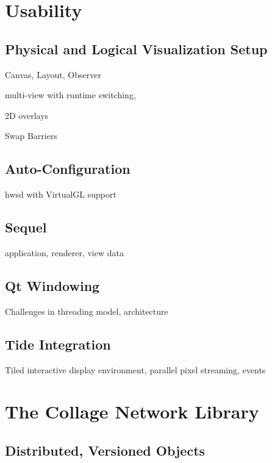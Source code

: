 \documentclass[journal]{vgtc}                %
\begin{document}
\section{Usability}

\subsection{Physical and Logical Visualization Setup}

Canvas, Layout, Observer

multi-view with runtime switching,

2D overlays

Swap Barriers

\subsection{Auto-Configuration}

hwsd with VirtualGL support

\subsection{Sequel}

application, renderer, view data

\subsection{Qt Windowing}

Challenges in threading model, architecture

\subsection{Tide Integration}

Tiled interactive display environment, parallel pixel streaming, events

\section{The Collage Network Library}

\subsection{Distributed, Versioned Objects}
\end{document}
